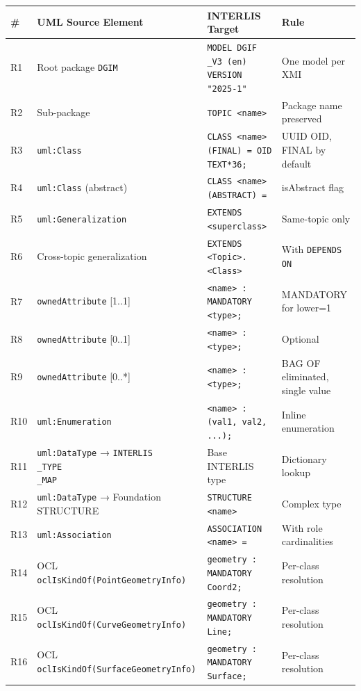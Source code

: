 \documentclass[conference]{IEEEtran}
\begin{document}
\begin{center}
\begin{longtable}{p{}p{}p{}p{}}
\\# & UML Source Element & INTERLIS Target & Rule \\
\midrule
R1 & Root package \texttt{DGIM} & \texttt{MODEL DGIF\\_V3 (en) VERSION "2025-1"} & One model per XMI \\
R2 & Sub-package & \texttt{TOPIC <name>} & Package name preserved \\
R3 & \texttt{uml:Class} & \texttt{CLASS <name> (FINAL) = OID TEXT*36;} & UUID OID, FINAL by default \\
R4 & \texttt{uml:Class} (abstract) & \texttt{CLASS <name> (ABSTRACT) =} & isAbstract flag \\
R5 & \texttt{uml:Generalization} & \texttt{EXTENDS <superclass>} & Same-topic only \\
R6 & Cross-topic generalization & \texttt{EXTENDS <Topic>.<Class>} & With \texttt{DEPENDS ON} \\
R7 & \texttt{ownedAttribute} [1..1] & \texttt{<name> : MANDATORY <type>;} & MANDATORY for lower=1 \\
R8 & \texttt{ownedAttribute} [0..1] & \texttt{<name> : <type>;} & Optional \\
R9 & \texttt{ownedAttribute} [0..*] & \texttt{<name> : <type>;} & BAG OF eliminated, single value \\
R10 & \texttt{uml:Enumeration} & \texttt{<name> : (val1, val2, ...);} & Inline enumeration \\
R11 & \texttt{uml:DataType} → \texttt{INTERLIS\\_TYPE\\_MAP} & Base INTERLIS type & Dictionary lookup \\
R12 & \texttt{uml:DataType} → Foundation STRUCTURE & \texttt{STRUCTURE <name>} & Complex type \\
R13 & \texttt{uml:Association} & \texttt{ASSOCIATION <name> =} & With role cardinalities \\
R14 & OCL \texttt{oclIsKindOf(PointGeometryInfo)} & \texttt{geometry : MANDATORY Coord2;} & Per-class resolution \\
R15 & OCL \texttt{oclIsKindOf(CurveGeometryInfo)} & \texttt{geometry : MANDATORY Line;} & Per-class resolution \\
R16 & OCL \texttt{oclIsKindOf(SurfaceGeometryInfo)} & \texttt{geometry : MANDATORY Surface;} & Per-class resolution \\

\end{longtable}
\end{center}
\end{document}
